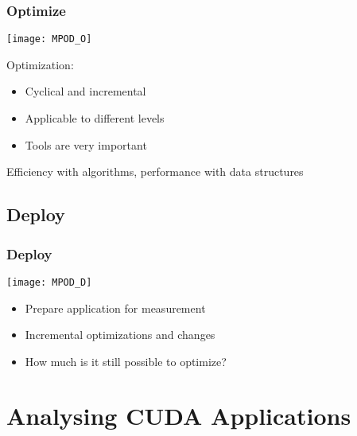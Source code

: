 \documentclass[10pt, compress]{beamer}
\begin{document}
\begin{frame}
    \frametitle{Optimize}
    \begin{center}
    \texttt{[image: MPOD\_O]}
    \end{center}

    \vfill


    Optimization:
    \begin{itemize}
        \item \alert{Cyclical}  and \alert{incremental}

        \item Applicable to \alert{different levels}

        \item \alert{Tools} are very important
    \end{itemize}


    \begin{center}
    \alert{Efficiency} with algorithms,  \alert{performance} with data structures
    \end{center}
\end{frame}

\subsection{Deploy}

\begin{frame}
    \frametitle{Deploy}
    \begin{center}
    \texttt{[image: MPOD\_D]}
    \end{center}

    \vfill


    \begin{itemize}
        \item Prepare application for \alert{measurement}

        \item \alert{Incremental} optimizations and changes

        \item How much is it still \alert{possible} to optimize?
    \end{itemize}
\end{frame}

\section{Analysing CUDA Applications}
\end{document}
